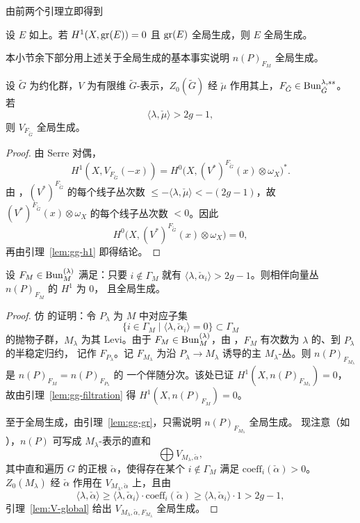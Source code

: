 由前两个引理立即得到

\begin{lemma}
\label{lem:gg-gr}
设 $E$ 如上。若 $H^1(X,\operatorname{gr}(E))=0$ 且 $\operatorname{gr}(E)$ 全局生成，则 $E$ 全局生成。
\end{lemma}

本小节余下部分用上述关于全局生成的基本事实说明 $n(P)_{F_M}$ 全局生成。

\begin{lemma}
\label{lem:V-global}
设 $\tilde G$ 为约化群，$V$ 为有限维 $\tilde G$-表示，$Z_0(\tilde G)$ 经 $\check\mu$
作用其上，$F_{\tilde G}\in \mathrm{Bun}^{\lambda,ss}_{\tilde G}$。若
\[
\langle\lambda,\check\mu\rangle>2g-1,
\]
则 $V_{F_{\tilde G}}$ 全局生成。
\end{lemma}

\begin{proof}
由 Serre 对偶，
\[
H^1(X,V_{F_{\tilde G}}(-x))
=H^0\bigl(X,(V^*)^{F_{\tilde G}}(x)\otimes \omega_X\bigr)^*.
\]
由 \cite[引理 10.3.2]{DG15}，$(V^*)^{F_{\tilde G}}$ 的每个线子丛次数
$\le -\langle\lambda,\check\mu\rangle<-(2g-1)$，故
$(V^*)^{F_{\tilde G}}(x)\otimes\omega_X$ 的每个线子丛次数 $<0$。因此
\[
H^0\bigl(X,(V^*)^{F_{\tilde G}}(x)\otimes\omega_X\bigr)=0,
\]
再由引理~\ref{lem:gg-h1} 即得结论。
\end{proof}

\begin{proposition}
\label{prop:nP-global}
设 $F_M\in \mathrm{Bun}^{(\lambda)}_M$ 满足：只要 $i\notin \Gamma_M$ 就有
$\langle\lambda,\check\alpha_i\rangle>2g-1$。则相伴向量丛 $n(P)_{F_M}$ 的 $H^1$ 为 $0$，
且全局生成。
\end{proposition}

\begin{proof}
仿 \cite[命题 10.4.5]{DG15} 的证明：令 $P_\lambda$ 为 $M$ 中对应子集
\[
\{i\in \Gamma_M\mid \langle\lambda,\check\alpha_i\rangle=0\}\subset \Gamma_M
\]
的抛物子群，$M_\lambda$ 为其 Levi。由于 $F_M\in \mathrm{Bun}^{(\lambda)}_M$，由
\cite[定理 7.4.3]{DG15}，$F_M$ 有次数为 $\lambda$ 的、到 $P_\lambda$ 的半稳定归约，
记作 $F_{P_\lambda}$。记 $F_{M_\lambda}$ 为沿 $P_\lambda\to M_\lambda$ 诱导的主
$M_\lambda$-丛。则 $n(P)_{F_{M_\lambda}}$ 是 $n(P)_{F_M}=n(P)_{F_{P_\lambda}}$ 的
一个伴随分次。该处已证 $H^1(X,n(P)_{F_{M_\lambda}})=0$，故由引理~\ref{lem:gg-filtration}
得 $H^1(X,n(P)_{F_M})=0$。

至于全局生成，由引理~\ref{lem:gg-gr}，只需说明 $n(P)_{F_{M_\lambda}}$ 全局生成。
现注意（如 \cite[10.4.1 小节]{DG15}），$n(P)$ 可写成 $M_\lambda$-表示的直和
\[
\bigoplus V_{M_\lambda,\check\alpha},
\]
其中直和遍历 $G$ 的正根 $\check\alpha$，使得存在某个 $i\notin \Gamma_M$ 满足
$\mathrm{coeff}_i(\check\alpha)>0$。$Z_0(M_\lambda)$ 经 $\check\alpha$ 作用在
$V_{M_\lambda,\check\alpha}$ 上，且由
\[
\langle\lambda,\check\alpha\rangle
\ge \langle\lambda,\check\alpha_i\rangle\cdot \mathrm{coeff}_i(\check\alpha)
\ge \langle\lambda,\check\alpha_i\rangle\cdot 1>2g-1,
\]
引理~\ref{lem:V-global} 给出 $V_{M_\lambda,\check\alpha,F_{M_\lambda}}$ 全局生成。
\end{proof}

